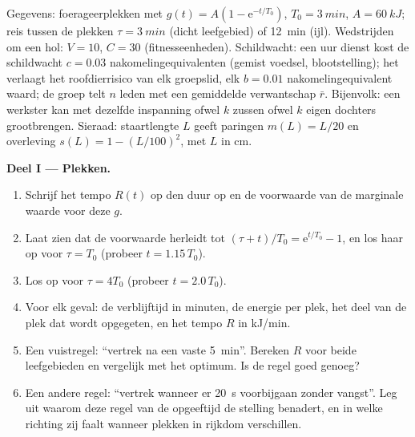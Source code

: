 \begin{problem}
\label{pb:b3:behavioural-ecology:1}
Gegevens: foerageerplekken met $g(t) = A(1 - \mathrm{e}^{-t/T_{0}})$, $T_{0}
= \qty{3}{min}$, $A = \qty{60}{kJ}$; reis tussen de plekken $\tau =
\qty{3}{min}$ (dicht leefgebied) of \qty{12}{min} (ijl). Wedstrijden om
een hol: $V = 10$, $C = 30$ (fitnesseenheden). Schildwacht: een uur
dienst kost de schildwacht $c = 0.03$ nakomelingequivalenten (gemist
voedsel, blootstelling); het verlaagt het roofdierrisico van elk
groepslid, elk $b = 0.01$ nakomelingequivalent waard; de groep telt $n$
leden met een gemiddelde verwantschap $\bar r$. Bijenvolk: een werkster
kan met dezelfde inspanning ofwel $k$ zussen ofwel $k$ eigen dochters
grootbrengen. Sieraad: staartlengte $L$ geeft paringen $m(L) = L/20$ en
overleving $s(L) = 1 - (L/100)^{2}$, met $L$ in cm.

\medskip
\noindent\textbf{Deel I --- Plekken.}
\begin{enumerate}
  \item Schrijf het tempo $R(t)$ op den duur op en de voorwaarde van de
        marginale waarde voor deze $g$.
  \item Laat zien dat de voorwaarde herleidt tot $(\tau + t)/T_{0} = \mathrm{e}^{t/T_{0}}
        - 1$, en los haar op voor $\tau = T_{0}$ (probeer $t = 1.15\,T_{0}$).
  \item Los op voor $\tau = 4T_{0}$ (probeer $t = 2.0\,T_{0}$).
  \item Voor elk geval: de verblijftijd in minuten, de energie per plek,
        het deel van de plek dat wordt opgegeten, en het tempo $R$ in kJ/min.
  \item Een vuistregel: ``vertrek na een vaste \qty{5}{min}''. Bereken
        $R$ voor beide leefgebieden en vergelijk met het optimum. Is de
        regel goed genoeg?
  \item Een andere regel: ``vertrek wanneer er \qty{20}{s} voorbijgaan
        zonder vangst''. Leg uit waarom deze regel van de opgeeftijd de
        stelling benadert, en in welke richting zij faalt wanneer
        plekken in rijkdom verschillen.
\end{enumerate}


\end{problem}

